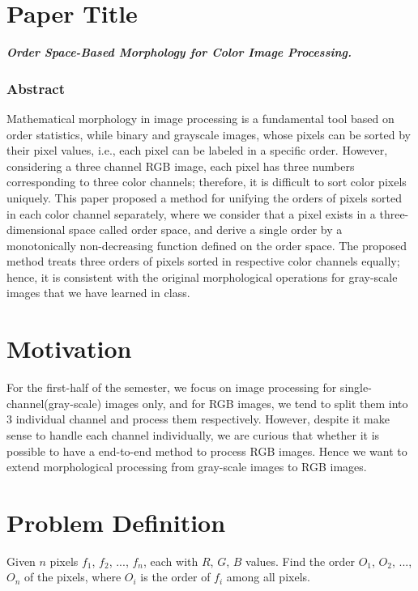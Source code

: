 \section*{Paper Title}
\textbf{\textit{Order Space-Based Morphology for Color Image Processing.}}


\subsubsection*{Abstract}
Mathematical morphology in image processing is a fundamental tool based on order statistics, while binary and grayscale images, whose pixels can be sorted by their pixel values, i.e., each pixel can be labeled in a specific order. However, considering a three channel RGB image, each pixel has three numbers corresponding to three color channels; therefore, it is difficult to sort color pixels uniquely. This paper proposed a method for unifying the orders of pixels sorted in each color channel separately, where we consider that a pixel exists in a three-dimensional space called order space, and derive a single order by a monotonically non-decreasing function defined on the order space. The proposed method treats three orders of pixels sorted in respective color channels equally; hence, it is consistent with the original morphological operations for gray-scale images that we have learned in class.

\section*{Motivation}
For the first-half of the semester, we focus on image processing for single-channel(gray-scale) images only, and for RGB images, we tend to split them into 3 individual channel and process them respectively. However, despite it make sense to handle each channel individually, we are curious that whether it is possible to have a end-to-end method to process RGB images. Hence we want to extend morphological processing from gray-scale images to RGB images.

\section*{Problem Definition}
Given $n$ pixels $f_1$, $f_2$, ..., $f_n$, each with $R$, $G$, $B$ values. Find the order $O_1$, $O_2$, ..., $O_n$ of the pixels, where $O_i$ is the order of $f_i$ among all pixels.



